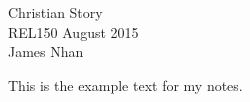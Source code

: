 \documentclass{article}
\begin{document}
\begin{center}
    {\large Christian Story} \\
    REL150  August 2015 \\
    James Nhan
\end{center}

This is the example text for my notes.
\end{document}
